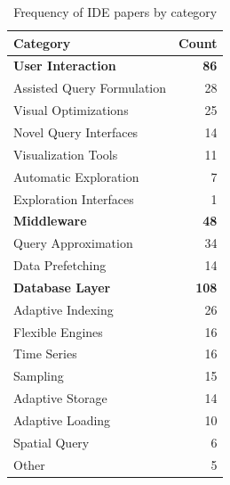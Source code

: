 \begin{table}[hptb]
  \small
  \begin{tabularx}{\textwidth}{X r} \hline
    \textbf{Category} & \textbf{Count} \\ \hline
    \textbf{User Interaction} & \textbf{86} \\
      \hspace{0.5em} Assisted Query Formulation & 28 \\
      \hspace{0.5em} Visual Optimizations & 25 \\
      \hspace{0.5em} Novel Query Interfaces & 14 \\
      \hspace{0.5em} Visualization Tools & 11 \\
      \hspace{0.5em} Automatic Exploration & 7 \\
      \hspace{0.5em} Exploration Interfaces & 1 \\
    \textbf{Middleware} & \textbf{48} \\
      \hspace{0.5em} Query Approximation & 34 \\
      \hspace{0.5em} Data Prefetching & 14 \\
    \textbf{Database Layer} & \textbf{108} \\
      \hspace{0.5em} Adaptive Indexing & 26 \\
      \hspace{0.5em} Flexible Engines & 16 \\
      \hspace{0.5em} Time Series & 16 \\
      \hspace{0.5em} Sampling & 15 \\
      \hspace{0.5em} Adaptive Storage & 14 \\
      \hspace{0.5em} Adaptive Loading & 10 \\
      \hspace{0.5em} Spatial Query & 6 \\
      \hspace{0.5em} Other & 5
  \end{tabularx}
  \caption{Frequency of \gls{IDE} papers by category}\label{tab:mapping/category_summary}
\end{table}

